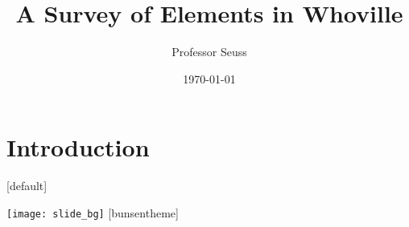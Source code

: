 \documentclass{beamer}
\title{A Survey of Elements in Whoville}
\author{Professor Seuss}
\institute[The Institute of Advanced Study]
{
Department of Chemistry \\
Whoville College \\
}
\date{\today}
\begin{document}
\section{Introduction}
[default]

\begin{frame}
\vspace{2cm}
  \titlepage
  \vspace{10cm}
\end{frame}

%
 {\texttt{[image: slide\_bg]}}
[bunsentheme]
\end{document}
